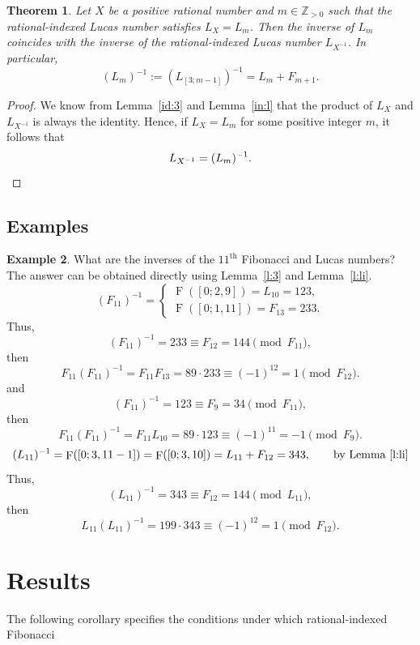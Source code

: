 \documentclass[11pt,reqno]{amsart}
\numberwithin{equation}{section}
\numberwithin{table}{section}
\numberwithin{figure}{section}
\DeclareMathOperator{\F}{F}
\theoremstyle{plain}
\newtheorem{thm}{Theorem}[section]
\theoremstyle{definition}
\newtheorem{example}[thm]{Example}
\theoremstyle{remark}
\begin{document}
\begin{thm}		Let $X$ be a positive rational number and $m \in \mathbb{Z}_{>0}$ such that the rational-indexed Lucas number satisfies $L_X = L_m$. Then the inverse of $L_m$ coincides with the inverse of the rational-indexed Lucas number $L_{X^{-1}}$. In particular,		\begin{equation}			(L_m)^{-1} := (L_{[3; m-1]})^{-1} = L_m + F_{m+1}.		\end{equation}	\end{thm}		\begin{proof}We know from Lemma~\ref{id:3} and Lemma~\ref{in:l} that the product of $L_X$ and $L_{X^{-1}}$ is always the identity. Hence, if $L_X = L_m$ for some positive integer $m$, it follows that\[L_{X^{-1}} = (L_m)^{-1}.\qedhere\]\end{proof}	\subsection{Examples}\begin{example}	What are the inverses of the $11^{\text{th}}$ Fibonacci and Lucas numbers? The answer can be obtained directly using Lemma~\ref{l:3} and Lemma~\ref{l:li}.\begin{equation*}(F_{11})^{-1} =\begin{cases}\F([0;2,9]) = L_{10} = 123,\\\F([0;1,11]) = F_{13} = 233.\end{cases}\end{equation*}	Thus,		\begin{equation*}			(F_{11})^{-1} = 233 \equiv F_{12} = 144 \pmod{F_{11}},		\end{equation*}		then		\begin{equation*}			 F_{11}(F_{11})^{-1} = F_{11}F_{13} = 89 \cdot 233 \equiv (-1)^{12} = 1 \pmod{F_{12}}.			 \end{equation*} 			and 			 \begin{equation*}			 (F_{11})^{-1} = 123 \equiv F_9 = 34 \pmod{F_{11}},			 \end{equation*}			 then			 \begin{equation*}			 	 F_{11}(F_{11})^{-1} = F_{11}L_{10} = 89 \cdot 123 \equiv (-1)^{11} = -1 \pmod{F_9}.			 \end{equation*}		\begin{equation*}		(L_{11})^{-1} = \F([0; 3, 11-1]) = \F([0; 3, 10]) = L_{11} + F_{12} = 343, \qquad \text{by Lemma~\ref{l:li}}	\end{equation*}	Thus, 	 \begin{equation*}		(L_{11})^{-1} = 343 \equiv F_{12} = 144 \pmod{L_{11}},	 \end{equation*}	then 	\begin{equation*}		L_{11}(L_{11})^{-1} = 199 \cdot 343 \equiv (-1)^{12} = 1 \pmod{F_{12}}.	\end{equation*}	\end{example} \section{Results}The following corollary specifies the conditions under which rational-indexed Fibonacci 
\end{document}
